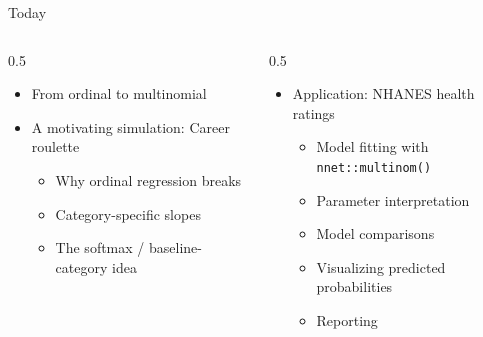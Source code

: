\documentclass[
  ignorenonframetext,
]{beamer}
\providecommand{\tightlist}{%
  \setlength{\itemsep}{0pt}\setlength{\parskip}{0pt}}
\begin{document}
\begin{frame}[fragile]{Today}
\label{today}
\begin{columns}[T]
\begin{column}{0.5\linewidth}
\begin{itemize}
\item
  From ordinal to multinomial
\item
  A motivating simulation: Career roulette

  \begin{itemize}
  \tightlist
  \item
    Why ordinal regression breaks
  \item
    Category-specific slopes
  \item
    The softmax / baseline-category idea
  \end{itemize}
\end{itemize}
\end{column}

\begin{column}{0.5\linewidth}
\begin{itemize}
\item
  Application: NHANES health ratings

  \begin{itemize}
  \tightlist
  \item
    Model fitting with \texttt{nnet::multinom()}
  \item
    Parameter interpretation
  \item
    Model comparisons
  \item
    Visualizing predicted probabilities
  \item
    Reporting
  \end{itemize}
\end{itemize}
\end{column}
\end{columns}

\end{frame}
\end{document}
